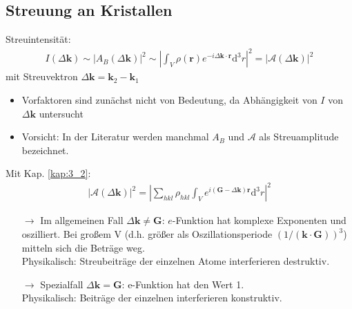 \subsection{Streuung an Kristallen} \label{kap:3_3}
Streuintensität:
\begin{align*}
    I(\Delta \textbf{k}) \sim |A_B (\Delta \textbf{k})|^2 \sim \left| \int_{V} \rho(\textbf{r})e^{-i \Delta \textbf{k} \cdot \textbf{r}} \mathrm{d}^3r\right|^2 = \left|\mathcal{A}(\Delta\textbf{k})\right|^2 
\end{align*}
mit Streuvektron $\Delta \textbf{k} = \textbf{k}_2-\textbf{k}_1$
\begin{itemize}
    \item Vorfaktoren sind zunächst nicht von Bedeutung, da Abhängigkeit von $I$ von $\Delta \textbf{k}$ untersucht
    \item Vorsicht: In der Literatur werden manchmal $A_B$ und $\mathcal{A}$ als Streuamplitude bezeichnet.
\end{itemize}
Mit Kap. \ref{kap:3_2}:
\begin{align*}
    \left| \mathcal{A} ( \Delta \textbf{k}) \right| ^2 = \left| \sum_{hkl} \rho_{hkl} \int_V e^{i(\textbf{G} - \Delta \textbf{k})\textbf{r}} \mathrm{d}^3 r \right|^2
\end{align*}

\begin{itemize}
    \item[$\rightarrow$] Im allgemeinen Fall $\Delta \textbf{k} \neq \textbf{G}$: $e$-Funktion hat komplexe Exponenten und oszilliert. Bei großem V (d.h. größer als Oszillationsperiode $\left(1 /(\textbf{k}\cdot \textbf{G})\right)^3$) mitteln sich die Beträge weg.\\
    Physikalisch: Streubeiträge der einzelnen Atome interferieren destruktiv.
    \item[$\rightarrow$] Spezialfall $\Delta \textbf{k} = \textbf{G}$: e-Funktion hat den Wert 1.\\
    Physikalisch: Beiträge der einzelnen interferieren konstruktiv.
\end{itemize}

